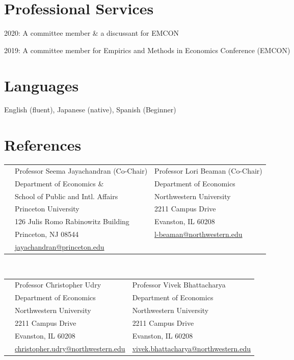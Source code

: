 \documentclass[margin,line]{res}
\newenvironment{list1}{
  \begin{list}{\ding{113}}{%
      \setlength{\itemsep}{.025in}
      \setlength{\parsep}{0in} \setlength{\parskip}{0in}
      \setlength{\topsep}{0in} \setlength{\partopsep}{0in}
      \setlength{\leftmargin}{0.17in}}}{\end{list}}
\begin{document}
\begin{resume}
\section{Professional Services}
\begin{list1}
\item[] 2020: A committee member \& a discussant for EMCON
\item[] 2019: A committee member for Empirics and Methods in Economics Conference (EMCON)
\end{list1}

\section{Languages}
\begin{list1}
\item[] English (fluent), Japanese (native), Spanish (Beginner)
\end{list1}

\section{References}
\vspace{.05in}
\begin{tabular}{@{}p{0.20in}p{2.75in}p{2.75in}}
 & Professor Seema Jayachandran (Co-Chair)  & Professor Lori Beaman (Co-Chair) \\
 & Department of Economics \& & Department of Economics \\
 & School of Public and Intl. Affairs & Northwestern University \\
 & Princeton University   &  2211 Campus Drive \\
 & 126 Julis Romo Rabinowitz Building  &  Evanston, IL 60208 \\
 & Princeton, NJ 08544  &  \href{mailto: l-beaman@northwestern.edu}{l-beaman@northwestern.edu} \\
 &  \href{mailto:  jayachandran@princeton.edu}{jayachandran@princeton.edu} & \\
\end{tabular}
\vspace{.1in} ~\\
\begin{tabular}{@{}p{0.20in}p{2.75in}p{2.75in}}
 & Professor Christopher Udry  & Professor Vivek Bhattacharya \\
 & Department of Economics   & Department of Economics \\
 & Northwestern University   & Northwestern University \\
 & 2211 Campus Drive  & 2211 Campus Drive  \\
 & Evanston, IL 60208  & Evanston, IL 60208\\
 &  \href{mailto: christopher.udry@northwestern.edu}{christopher.udry@northwestern.edu} &  \href{mailto: vivek.bhattacharya@northwestern.edu}{vivek.bhattacharya@northwestern.edu} \\
\end{tabular}

\end{resume}
\end{document}
